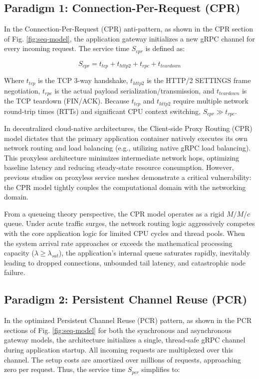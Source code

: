 \documentclass{ieeeaccess}
\begin{document}
\subsection{Paradigm 1: Connection-Per-Request (CPR)}
\label{sec2.1}

In the Connection-Per-Request (CPR) anti-pattern, as shown in the CPR section of Fig. \ref{fig:seq-model}, the application gateway initializes a new gRPC channel for every incoming request. The service time $S_{cpr}$ is defined as:

\begin{equation}
    S_{cpr} = t_{tcp} + t_{http2} + t_{rpc} + t_{teardown}
\end{equation}

Where $t_{tcp}$ is the TCP 3-way handshake, $t_{http2}$ is the HTTP/2 SETTINGS frame negotiation, $t_{rpc}$ is the actual payload serialization/transmission, and $t_{teardown}$ is the TCP teardown (FIN/ACK). Because $t_{tcp}$ and $t_{http2}$ require multiple network round-trip times (RTTs) and significant CPU context switching, $S_{cpr} \gg t_{rpc}$.

In decentralized cloud-native architectures, the Client-side Proxy Routing (CPR) model dictates that the primary application container natively executes its own network routing and load balancing (e.g., utilizing native gRPC load balancing). This proxyless architecture minimizes intermediate network hops, optimizing baseline latency and reducing steady-state resource consumption. However, previous studies on proxyless service meshes demonstrate a critical vulnerability: the CPR model tightly couples the computational domain with the networking domain.

From a queueing theory perspective, the CPR model operates as a rigid $M/M/c$ queue. Under acute traffic surges, the network routing logic aggressively competes with the core application logic for limited CPU cycles and thread pools. When the system arrival rate approaches or exceeds the mathematical processing capacity ($\lambda \ge  \lambda_{sat}$), the application’s internal queue saturates rapidly, inevitably leading to dropped connections, unbounded tail latency, and catastrophic node failure.

\subsection{Paradigm 2: Persistent Channel Reuse (PCR)}
\label{sec2.2}

In the optimized Persistent Channel Reuse (PCR) pattern, as shown in the PCR sections of Fig. \ref{fig:seq-model} for both the synchronous and asynchronous gateway models, the architecture initializes a single, thread-safe gRPC channel during application startup. All incoming requests are multiplexed over this channel. The setup costs are amortized over millions of requests, approaching zero per request. Thus, the service time $S_{pcr}$ simplifies to:
\end{document}
